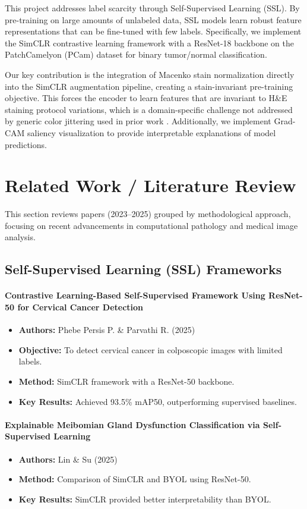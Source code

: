 \documentclass[conference]{IEEEtran}
\begin{document}
This project addresses label scarcity through Self-Supervised Learning (SSL). By pre-training on large amounts of unlabeled data, SSL models learn robust feature representations that can be fine-tuned with few labels. Specifically, we implement the SimCLR contrastive learning framework \cite{persis2025} with a ResNet-18 backbone on the PatchCamelyon (PCam) dataset for binary tumor/normal classification.

Our key contribution is the integration of Macenko stain normalization \cite{tran2025} directly into the SimCLR augmentation pipeline, creating a stain-invariant pre-training objective. This forces the encoder to learn features that are invariant to H\&E staining protocol variations, which is a domain-specific challenge not addressed by generic color jittering used in prior work \cite{persis2025, lin2025}. Additionally, we implement Grad-CAM saliency visualization to provide interpretable explanations of model predictions.

\section{Related Work / Literature Review}
This section reviews papers (2023–2025) grouped by methodological approach, focusing on recent advancements in computational pathology and medical image analysis.

\subsection{Self-Supervised Learning (SSL) Frameworks}

\paragraph{Contrastive Learning-Based Self-Supervised Framework Using ResNet-50 for Cervical Cancer Detection}
\begin{itemize}
\item \textbf{Authors:} Phebe Persis P. \& Parvathi R. (2025) \cite{persis2025}
\item \textbf{Objective:} To detect cervical cancer in colposcopic images with limited labels.
\item \textbf{Method:} SimCLR framework with a ResNet-50 backbone.
\item \textbf{Key Results:} Achieved 93.5\% mAP50, outperforming supervised baselines.
\end{itemize}

\paragraph{Explainable Meibomian Gland Dysfunction Classification via Self-Supervised Learning}
\begin{itemize}
\item \textbf{Authors:} Lin \& Su (2025) \cite{lin2025}
\item \textbf{Method:} Comparison of SimCLR and BYOL using ResNet-50.
\item \textbf{Key Results:} SimCLR provided better interpretability than BYOL.
\end{itemize}
\end{document}
